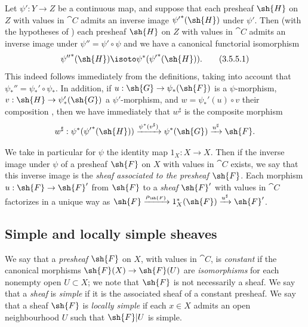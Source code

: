 \begin{env}[3.5.5]
\label{0.3.5.5}
Let $\psi':Y\to Z$ be a continuous map, and suppose that each presheaf $\sh{H}$
on $Z$ with values in $\cat{C}$ admits an inverse image ${\psi'}^*(\sh{H})$ under
$\psi'$. Then (with the hypotheses of ) each presheaf $\sh{H}$
on $Z$ with values in $\cat{C}$ admits an inverse image under $\psi''=\psi'\circ\psi$
and we have a canonical functorial isomorphism
\[
  {\psi''}^*(\sh{H})\isoto\psi^*({\psi'}^*(\sh{H})).
  \tag{3.5.5.1}
\]
This indeed follows immediately from the definitions, taking into account that
$\psi_*''=\psi_*'\circ\psi_*$. In addition, if $u:\sh{G}\to\psi_*(\sh{F})$ is a
$\psi$-morphism, $v:\sh{H}\to\psi_*'(\sh{G})$ a $\psi'$-morphism, and
$w=\psi_*'(u)\circ v$ their composition , then we have
immediately that $w^\sharp$ is the composite morphism
\[
  w^\sharp:\psi^*({\psi'}^*(\sh{H}))\xrightarrow{\psi^*(v^\sharp)}\psi^*(\sh{G})\xrightarrow{u^\sharp}\sh{F}.
\]
\end{env}

\begin{env}[3.5.6]
\label{0.3.5.6}
We take in particular for $\psi$ the identity map $1_X:X\to X$. Then if the
inverse image under $\psi$ of a presheaf $\sh{F}$ on $X$ with values in $\cat{C}$
exists, we say that this inverse image is the \emph{sheaf associated to the
presheaf $\sh{F}$}. Each morphism $u:\sh{F}\to\sh{F}'$ from $\sh{F}$ to a
\emph{sheaf} $\sh{F}'$ with values in $\cat{C}$ factorizes in a unique way as
$\sh{F}\xrightarrow{\rho_\sh{F}}1_X^*(\sh{F})\xrightarrow{u^\sharp}\sh{F}'$.
\end{env}

\subsection{Simple and locally simple sheaves}
\label{subsection:0.3.6}
\label{0.3.6}

\begin{env}[3.6.1]
\label{0.3.6.1}
We say that a \emph{presheaf} $\sh{F}$ on $X$, with values in $\cat{C}$, is
\emph{constant} if the canonical morphisms $\sh{F}(X)\to\sh{F}(U)$ are
\emph{isomorphisms} for each nonempty open $U\subset X$; we note that $\sh{F}$
is not necessarily a sheaf. We say that a \emph{sheaf} is \emph{simple} if it is
the associated sheaf  of a constant presheaf. We say that a
sheaf $\sh{F}$ is \emph{locally simple} if each $x\in X$ admits an open
neighbourhood $U$ such that $\sh{F}|U$ is simple.
\end{env}

